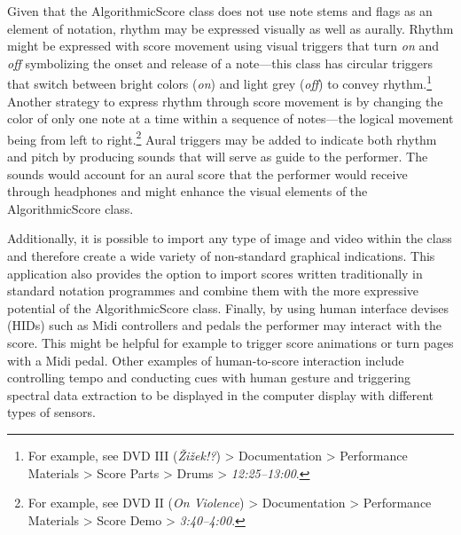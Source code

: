 Given that the AlgorithmicScore class does not use note stems and flags as an element of notation, rhythm may be expressed visually as well as aurally. Rhythm might be expressed with score movement using visual triggers that turn \emph{on} and \emph{off} symbolizing the onset and release of a note---this class has circular triggers that switch between bright colors (\emph{on}) and light grey (\emph{off}) to convey rhythm.\footnote{For example, see DVD III (\emph{\v{Z}i\v{z}ek!?}) \tiny \textgreater \footnotesize \hspace{0pt} Documentation \tiny \textgreater \footnotesize \hspace{0pt} Performance Materials \tiny \textgreater \footnotesize \hspace{0pt} Score Parts \tiny \textgreater \footnotesize \hspace{0pt} Drums \tiny \textgreater \footnotesize \hspace{0pt} \mbox{\emph{12:25--13:00}}.} Another strategy to express rhythm through score movement is by changing the color of only one note at a time within a sequence of notes---the logical movement being from left to right.\footnote{For example, see DVD II (\emph{On Violence}) \tiny \textgreater \footnotesize \hspace{0pt} Documentation \tiny \textgreater \footnotesize \hspace{0pt} Performance Materials \tiny \textgreater \footnotesize \hspace{0pt} Score Demo \tiny \textgreater \footnotesize  \hspace{0pt} \mbox{\emph{3:40--4:00}}.} Aural triggers may be added to indicate both rhythm and pitch by producing sounds that will serve as guide to the performer. The sounds would account for an aural score that the performer would receive through headphones and might enhance the visual elements of the AlgorithmicScore class.

Additionally, it is possible to import any type of image and video within the class and therefore create a wide variety of non-standard graphical indications. This application also provides the option to import scores written traditionally in standard notation programmes and combine them with the more expressive potential of the AlgorithmicScore class. Finally, by using human interface devises (HIDs) such as Midi controllers and pedals the performer may interact with the score. This might be helpful for example to trigger score animations or turn pages with a Midi pedal. Other examples of human-to-score interaction include controlling tempo and conducting cues with human gesture and triggering spectral data extraction to be displayed in the computer display with different types of sensors. 

